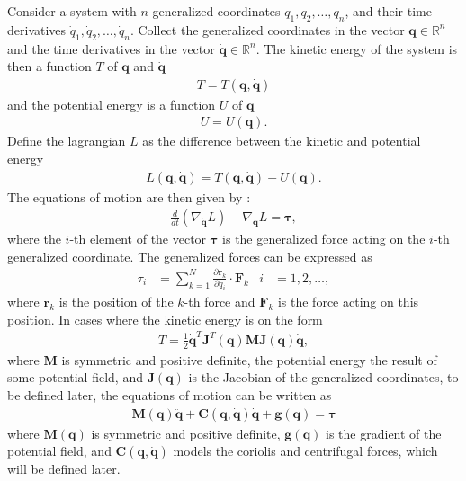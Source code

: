 Consider a system with $n$ generalized coordinates $q_1, q_2, \ldots, q_n$, and
their time derivatives $\dot{q}_1, \dot{q}_2, \ldots, \dot{q}_n$. Collect the
generalized coordinates in the vector $\bm{q} \in \mathbb{R}^n$ and the time
derivatives in the vector $\bm{\dot{q}} \in \mathbb{R}^n$. The kinetic energy
of the system is then a function $T$ of $\bm{q}$ and $\bm{\dot{q}}$
\begin{align}
    T = T(\bm{q}, \bm{\dot{q}})
\end{align}
and the potential energy is a function $U$ of $\bm{q}$
\begin{align}
    U = U(\bm{q}).
\end{align}
Define the lagrangian $L$ as the difference between the kinetic and potential
energy
\begin{align}
    L(\bm{q}, \bm{\dot{q}}) = T(\bm{q}, \bm{\dot{q}}) - U(\bm{q}).
\end{align}
The equations of motion are then given by \cite{modsim}:
\begin{align}
    \frac{d}{dt} \left( \nabla_{\dot{\bm{q}}} L \right) - \nabla_{\bm{q}} L = \bm{\tau},
\end{align}
where the $i$-th element of the vector $\bm{\tau}$ is the generalized force acting
on the $i$-th generalized coordinate. The generalized forces can be expressed as
\begin{align}
    \tau_i &= \sum_{k=1}^N \frac{\partial \bm{r}_k}{\partial q_i} \cdot \bm{F}_k
    & i &= 1, 2, \ldots,
\end{align}
where $\bm{r}_k$ is the position of the $k$-th force and $\bm{F}_k$ is the force
acting on this position. In cases where the kinetic energy is on the form
\begin{align}
    T = \frac{1}{2} \bm{\dot{q}}^T \bm{J}^T(\bm{q}) \bm{M} \bm{J}(\bm{q}) \bm{\dot{q}},
\end{align}
where $\bm{M}$ is symmetric and positive definite, the potential energy the
result of some potential field, and $\bm{J}(\bm{q})$ is the Jacobian of the
generalized coordinates, to be defined later, the equations of motion can be
written as
\begin{align}
    \bm{M}(\bm{q}) \ddot{\bm{q}} + \bm{C}(\bm{q}, \dot{\bm{q}}) \dot{\bm{q}} + \bm{g}(\bm{q}) = \bm{\tau}
\end{align}
where $\bm{M}(\bm{q})$ is symmetric and positive definite, $\bm{g}(\bm{q})$ is the
gradient of the potential field, and $\bm{C}(\bm{q}, \dot{\bm{q}})$ models the
coriolis and centrifugal forces, which will be defined later.

